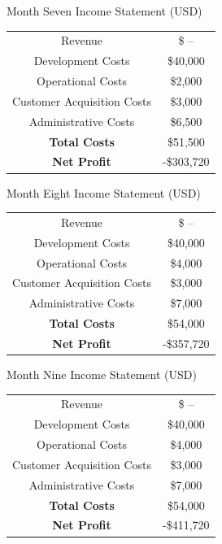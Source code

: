 \documentclass[12pt]{article}
\begin{document}
\vspace{1.5cm}
\begin{center}
	Month Seven Income Statement (USD) \\[1.5ex]
	
	\begin{tabular}{c | c}
	Revenue & \$ -- \\
	Development Costs & \$40,000 \\
	Operational Costs & \$2,000 \\
	Customer Acquisition Costs & \$3,000 \\
	Administrative Costs & \$6,500 \\
	\textbf{Total Costs} & \$51,500 \\
	\textbf{Net Profit} & -\$303,720
	\end{tabular}
\end{center}
\vspace{1.5cm}
\begin{center}
	Month Eight Income Statement (USD) \\[1.5ex]
	
	\begin{tabular}{c | c}
	Revenue & \$ -- \\
	Development Costs & \$40,000 \\
	Operational Costs & \$4,000 \\
	Customer Acquisition Costs & \$3,000 \\
	Administrative Costs & \$7,000 \\
	\textbf{Total Costs} & \$54,000 \\
	\textbf{Net Profit} & -\$357,720
	\end{tabular}
\end{center}
\vspace{1.5cm}
\begin{center}
	Month Nine Income Statement (USD) \\[1.5ex]
	
	\begin{tabular}{c | c}
	Revenue & \$ -- \\
	Development Costs & \$40,000 \\
	Operational Costs & \$4,000 \\
	Customer Acquisition Costs & \$3,000 \\
	Administrative Costs & \$7,000 \\
	\textbf{Total Costs} & \$54,000 \\
	\textbf{Net Profit} & -\$411,720
	\end{tabular}
\end{center}
\end{document}
